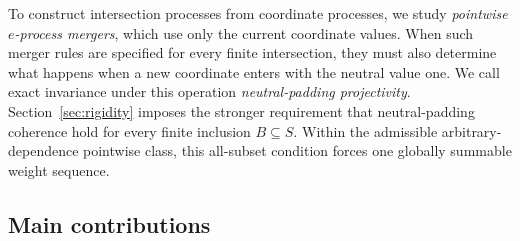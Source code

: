 \documentclass[11pt]{article}
\numberwithin{equation}{section}
\theoremstyle{plain}
\theoremstyle{definition}
\begin{document}
To construct intersection processes from coordinate processes, we study \emph{pointwise $e$-process mergers}, which use only the current coordinate values. When such
merger rules are specified for every finite intersection, they must also determine what happens when
a new coordinate enters with the neutral value one. We call exact invariance under this operation \emph{neutral-padding projectivity}. Section~\ref{sec:rigidity} imposes the stronger requirement that
neutral-padding coherence hold for every finite inclusion $B\subseteq S$.
Within the admissible arbitrary-dependence pointwise class, this
all-subset condition forces one globally summable weight sequence.

\subsection{Main contributions}\label{sec:contributions}
\end{document}
